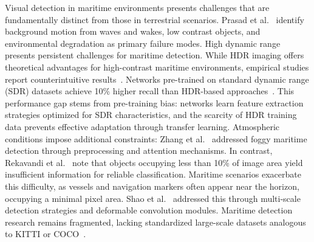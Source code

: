 \documentclass{erauthesis}
\begin{document}
Visual detection in maritime environments presents challenges that are fundamentally distinct from those in terrestrial scenarios.
Prasad et al.~\cite{prasad2017} identify background motion from waves and wakes, low contrast objects, and environmental degradation as primary failure modes.
High dynamic range presents persistent challenges for maritime detection.
While HDR imaging offers theoretical advantages for high-contrast maritime environments, empirical studies report counterintuitive results~\cite{landaeta, liebergall, wang2019a}.
Networks pre-trained on standard dynamic range (SDR) datasets achieve 10\% higher recall than HDR-based approaches~\cite{landaeta, liebergall}.
This performance gap stems from pre-training bias: networks learn feature extraction strategies optimized for SDR characteristics, and the scarcity of HDR training data prevents effective adaptation through transfer learning.
Atmospheric conditions impose additional constraints: Zhang et al.~\cite{zhang2022a} addressed foggy maritime detection through preprocessing and attention mechanisms. In contrast, Rekavandi et al.~\cite{rekavandi2022} note that objects occupying less than 10\% of image area yield insufficient information for reliable classification.
Maritime scenarios exacerbate this difficulty, as vessels and navigation markers often appear near the horizon, occupying a minimal pixel area.
Shao et al.~\cite{shao2022} addressed this through multi-scale detection strategies and deformable convolution modules.
Maritime detection research remains fragmented, lacking standardized large-scale datasets analogous to KITTI or COCO~\cite{zhang2021, yang2024, su2023}.



\end{document}
